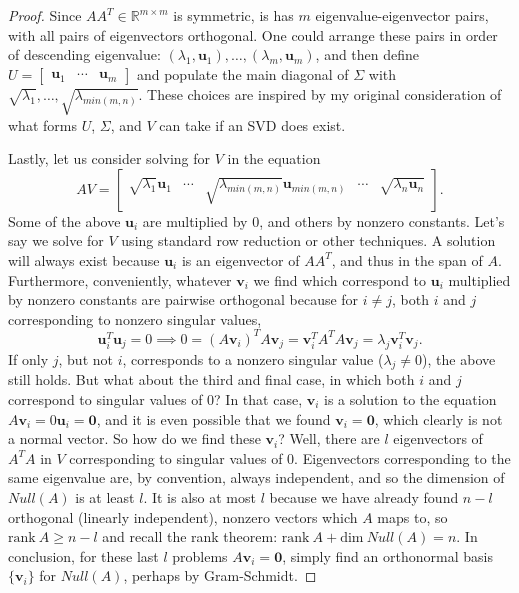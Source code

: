 \documentclass[draft,12pt]{report}
\renewcommand{\vec}[1]{\mathbf{#1}}
\begin{document}
\begin{proof}
    Since $AA^T \in \mathbb R^{m \times m}$ is symmetric, is has $m$ eigenvalue-eigenvector pairs, with all pairs of eigenvectors orthogonal. One could arrange these pairs in order of descending eigenvalue: $(\lambda_1, \vec{u}_1), \ldots, (\lambda_m, \vec{u}_m)$, and then define $U = \begin{bmatrix} \vec{u}_1 & \cdots & \vec{u}_m \end{bmatrix}$ and populate the main diagonal of $\Sigma$ with $\sqrt{\lambda_1}, \ldots, \sqrt{\lambda_{min(m, n)}}$. These choices are inspired by my original consideration of what forms $U$, $\Sigma$, and $V$ can take if an SVD does exist.
    
    Lastly, let us consider solving for $V$ in the equation
    \[ AV = \begin{bmatrix} \sqrt{\lambda_1}\vec{u}_1 & \cdots & \sqrt{\lambda_{min(m, n)}}\vec{u}_{min(m, n)} & \cdots & \sqrt{\lambda_n\vec{u}_n} \end{bmatrix}. \]
    Some of the above $\vec{u}_i$ are multiplied by 0, and others by nonzero constants. Let's say we solve for $V$ using standard row reduction or other techniques. A solution will always exist because $\vec{u}_i$ is an eigenvector of $AA^T$, and thus in the span of $A$. Furthermore, conveniently, whatever $\vec{v}_i$ we find which correspond to $\vec{u}_i$ multiplied by nonzero constants are pairwise orthogonal because for $i \neq j$, both $i$ and $j$ corresponding to nonzero singular values,
    \[ \vec{u}_i^T \vec{u}_j = 0 \implies 0 = (A\vec{v}_i)^T A\vec{v}_j = \vec{v}_i^T A^TA \vec{v}_j = \lambda_j \vec{v}_i^T \vec{v}_j. \]
    If only $j$, but not $i$, corresponds to a nonzero singular value ($\lambda_j \neq 0$), the above still holds. But what about the third and final case, in which both $i$ and $j$ correspond to singular values of 0? In that case, $\vec{v}_i$ is a solution to the equation $A\vec{v}_i = 0\vec{u}_i = \vec{0}$, and it is even possible that we found $\vec{v}_i = \vec{0}$, which clearly is not a normal vector. So how do we find these $\vec{v}_i$? Well, there are $l$ eigenvectors of $A^TA$ in $V$ corresponding to singular values of 0. Eigenvectors corresponding to the same eigenvalue are, by convention, always independent, and so the dimension of $Null(A)$ is at least $l$. It is also at most $l$ because we have already found $n - l$ orthogonal (linearly independent), nonzero vectors which $A$ maps to, so $\mathrm{rank\ } A \geq n - l$ and recall the rank theorem: $\mathrm{rank\ } A + \mathrm{dim\ } Null(A) = n$. In conclusion, for these last $l$ problems $A\vec{v}_i = \vec{0}$, simply find an orthonormal basis $\{ \vec{v}_i \}$ for $Null(A)$, perhaps by Gram-Schmidt.
    

\end{proof}
\end{document}
